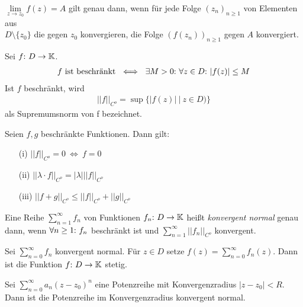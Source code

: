 \begin{framedthm}
	$\lim\limits_{z \to z_0} f(z) = A$ gilt genau dann, wenn für jede Folge $(z_n)_{n\geq 1}$ von Elementen aus\\ $D\setminus\{z_0\}$ die gegen $z_0$ konvergieren, die Folge $(f(z_n))_{n\geq 1}$ gegen $A$ konvergiert.
\end{framedthm}

\begin{frameddefn}
	Sei $f{:}\  D \to \mathbb{K}$.
	\begin{align*}
		f \textrm{ ist beschränkt} \ \iff\ \exists M > 0{:}\  \forall z \in D{:}\  |f(z)| \leq M
	\end{align*}
	Ist $f$ beschränkt, wird
	\begin{align*}
		||f||_{C^o} = \sup\{|f(z)|\ \big|\ z \in D)\}
	\end{align*}
	als Supremumsnorm von f bezeichnet.
\end{frameddefn}

\begin{framedthm}
	Seien $f,g$ beschränkte Funktionen. Dann gilt:
	\begin{enumerate}
		\item[(i)] $||f||_{C^o} = 0 \ \iff\ f = 0$
		\item[(ii)] $||\lambda\cdot f||_{C^o} = |\lambda|||f||_{C^o}$
		\item[(iii)] $||f+g||_{C^o} \leq ||f||_{C^o} + ||g||_{C^o}$
	\end{enumerate}
\end{framedthm}

\begin{frameddefn}
	Eine Reihe $\sum_{n=1}^{\infty} f_n$ von Funktionen $f_n{:}\  D \to \mathbb{K}$ heißt \textit{konvergent normal} genau dann, wenn $\forall n \geq 1{:}\  f_n$ beschränkt ist und $\sum_{n=1}^{\infty}||f_n||_{C^o}$ konvergent.
\end{frameddefn}

\begin{framedthm}
	Sei $\sum_{n=0}^{\infty}f_n$ konvergent normal. Für $z \in D$ setze $f(z) = \sum_{n=0}^{\infty}f_n(z)$. Dann ist die Funktion $f{:}\  D \to \mathbb{K}$ stetig.
\end{framedthm}

\begin{framedquest}
	Sei $\sum_{n=0}^{\infty} a_n (z-z_0)^n$ eine Potenzreihe mit Konvergenzradius $|z-z_0| < R$. Dann ist die Potenzreihe im Konvergenzradius konvergent normal.
\end{framedquest}

